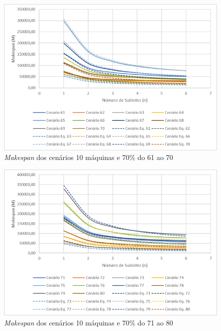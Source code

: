 \begin{figure}[H]
    \centering
     \includegraphics[width=13cm]{Apendices/Figuras/10m70_61-70.png}
     \caption{\textit{Makespan} dos cenários 10 máquinas e 70\% do 61 ao 70}
    \label{fig:10m70_61-70}
\end{figure}

\begin{figure}[H]
    \centering
     \includegraphics[width=13cm]{Apendices/Figuras/10m70_71-80.png}
     \caption{\textit{Makespan} dos cenários 10 máquinas e 70\% do 71 ao 80}
    \label{fig:10m70_71-80}
\end{figure}

